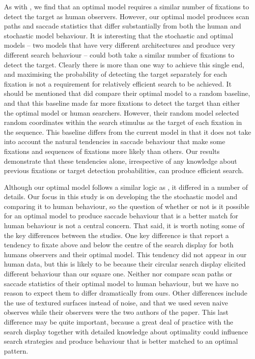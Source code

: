 \documentclass[preprint, authoryear]{elsarticle} %
\begin{document}
As with \cite{najemnik-geisler2005,najemnik-geisler2008}, we find that an optimal model requires a similar number of fixations to detect the target as human observers. However, our optimal model produces scan paths and saccade statistics that differ substantially from both the human and stochastic model behaviour. It is interesting that the stochastic and optimal models -- two models that have very different architectures and produce very different search behaviour -- could both take a similar number of fixations to detect the target. Clearly there is more than one way to achieve this single end, and maximising the probability of detecting the target separately for each fixation is not a requirement for relatively efficient search to be achieved. It should be mentioned that  \cite{najemnik-geisler2005} did compare their optimal model to a random baseline, and that this baseline made far more fixations to detect the target than either the optimal model or human searchers. However, their random model selected random coordinates within the search stimulus as the target of each fixation in the sequence. This baseline differs from the current model in that it does not take into account the natural tendencies in saccade behaviour that make some fixations and sequences of fixations more likely than others. Our results demonstrate that these tendencies alone, irrespective of any knowledge about previous fixations or target detection probabilities, can produce efficient search. 
\par
Although our optimal model follows a similar logic as \cite{najemnik-geisler2005,najemnik-geisler2008}, it differed in a number of details. Our focus in this study is on developing the the stochastic model and comparing it to human behaviour, so the question of whether or not is it possible for an optimal model to produce saccade behaviour that is a better match for human behaviour is not a central concern. That said, it is worth noting some of the key differences between the studies. One key difference is that \cite{najemnik-geisler2008} report a tendency to fixate above and below the centre of the search display for both humans observers and their optimal model. This tendency did not appear in our human data, but this is likely to be because their circular search display elicited different behaviour than our square one. Neither \cite{najemnik-geisler2005} nor \cite{najemnik-geisler2008} compare scan paths or saccade statistics of their optimal model to human behaviour, but we have no reason to expect them to differ dramatically from ours. Other differences include the use of textured surfaces instead of noise, and that we used seven naive observes while their observers were the two authors of the paper. This last difference may be quite important, because a great deal of practice with the search display together with detailed knowledge about optimality could influence search strategies and produce behaviour that is better matched to an optimal pattern. 
\par
\end{document}
